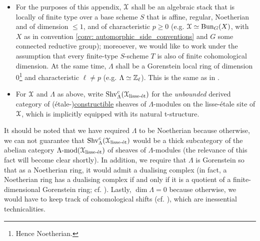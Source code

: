         \begin{convention} \label{conv: l_adic_sheaves_conventions}
            \noindent
            \begin{itemize}
                \item For the purposes of this appendix, $\mathcal{X}$ shall be an algebraic stack that is locally of finite type over a base scheme $S$ that is affine, regular, Noetherian and of dimension $\leq 1$, and of characteristic $p \geq 0$ (e.g. $\mathcal{X} \simeq \mathrm{Bun}_G(X)$, with $X$ as in convention \ref{conv: automorphic_side_conventions} and $G$ some connected reductive group); moreoever, we would like to work under the assumption that every finite-type $S$-scheme $T$ is also of finite cohomological dimension. At the same time, $\Lambda$ shall be a Gorenstein local ring of dimension $0$\footnote{Hence Noetherian.} and characteristic $\ell \not = p$ (e.g. $\Lambda \simeq \mathbb{Z}_{\ell}$). This is the same as in \cite{laszlo_olsson_adic_sheaves_on_artin_stacks_1}.
                \item For $\mathcal{X}$ and $\Lambda$ as above, write $\mathrm{Shv}_{\Lambda}^c(\mathcal{X}_{\mathrm{lisse}\text{-}\mathrm{\acute{e}t}})$ for the \textit{unbounded} derived category of (\'etale-)\href{https://stacks.math.columbia.edu/tag/03RW}{\underline{constructible}} sheaves of $\Lambda$-modules on the lisse-\'etale site of $\mathcal{X}$, which is implicitly equipped with its natural t-structure.
            \end{itemize}
        \end{convention}
        \begin{remark}
            It should be noted that we have required $\Lambda$ to be Noetherian because otherwise, we can not guarantee that $\mathrm{Shv}_{\Lambda}^c(\mathcal{X}_{\mathrm{lisse}\text{-}\mathrm{\acute{e}t}})$ would be a thick subcategory of the abelian category $\Lambda\text{-}\mathrm{mod}(\mathcal{X}_{\mathrm{lisse}\text{-}\mathrm{\acute{e}t}})$ of sheaves of $\Lambda$-modules (the relevance of this fact will become clear shortly). In addition, we require that $\Lambda$ is Gorenstein so that as a Noetherian ring, it would admit a dualising complex (in fact, a Noetherian ring has a dualising complex if and only if it is a quotient of a finite-dimensional Gorenstein ring; cf. \cite[Corollary 1.4]{kawasaki_macaulayfication_of_noetherian_rings}). Lastly, $\dim \Lambda = 0$ because otherwise, we would have to keep track of cohomological shifts (cf. \cite[\href{https://stacks.math.columbia.edu/tag/0AWS}{Tag 0AWS} and \href{https://stacks.math.columbia.edu/tag/0B5A}{Tag 0B5A}]{stacks}), which are inessential technicalities.
        \end{remark}
        

